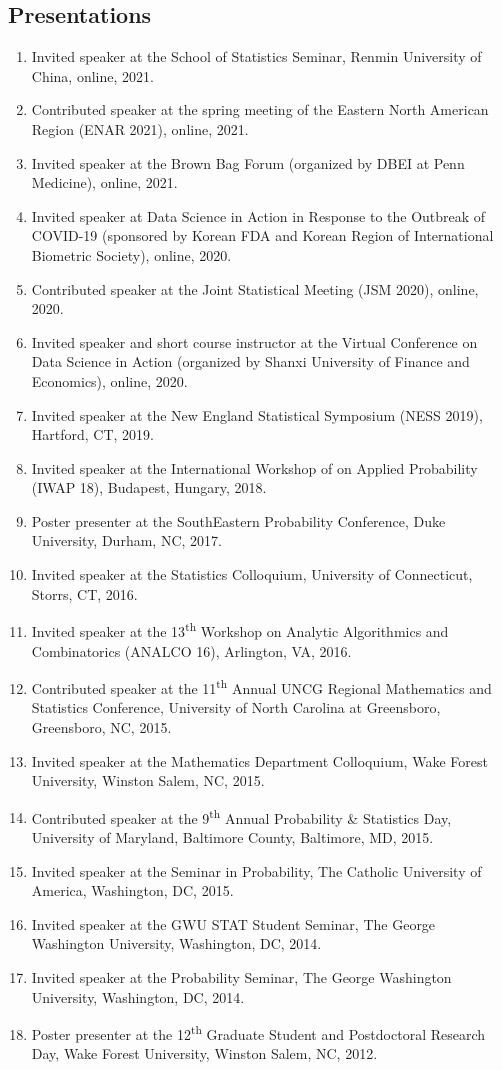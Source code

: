 \documentclass[margin]{res}
\begin{document}
\begin{resume}
\section{Presentations}
\begin{enumerate}
	\item Invited speaker at the School of Statistics Seminar, 
	Renmin University of China, online, 2021.
	\item Contributed speaker at the spring meeting of the Eastern 
	North American Region (ENAR 2021), online, 2021.
	\item Invited speaker at the Brown Bag Forum (organized by DBEI 
	at Penn Medicine), online, 2021.
	\item Invited speaker at Data Science in Action in Response to 
	the Outbreak of COVID-19 (sponsored by Korean FDA and Korean 
	Region of International Biometric Society), online, 2020.
	\item Contributed speaker at the Joint Statistical Meeting (JSM 
	2020), 
	online, 2020.
	\item Invited speaker and short course instructor at the Virtual 
	Conference on Data Science in Action (organized by Shanxi 
	University of Finance and Economics), online, 2020.
	\item Invited speaker at the New England Statistical Symposium (NESS 2019), Hartford, CT, 2019.
	\item Invited speaker at the International Workshop of on Applied Probability (IWAP 18), Budapest, Hungary, 2018.
	\item Poster presenter at the SouthEastern Probability Conference, Duke University, Durham, NC, 2017.
	\item Invited speaker at the Statistics Colloquium, University of Connecticut, Storrs, CT, 2016.
	\item Invited speaker at the 13\textsuperscript{th} Workshop on Analytic Algorithmics and Combinatorics (ANALCO 16), Arlington, VA, 2016.
	\item Contributed speaker at the 11\textsuperscript{th} Annual UNCG Regional Mathematics and Statistics Conference, University of North Carolina at Greensboro, Greensboro, NC, 2015.
	\item Invited speaker at the Mathematics Department Colloquium, Wake Forest University, Winston Salem, NC, 2015. 
	\item Contributed speaker at the 9\textsuperscript{th} Annual Probability \& Statistics Day, University of Maryland, Baltimore County, Baltimore, MD, 2015.
	\item Invited speaker at the Seminar in Probability, The Catholic University of America, Washington, DC, 2015.
	\item Invited speaker at the GWU STAT Student Seminar, The George Washington University, Washington, DC, 2014.
	\item Invited speaker at the Probability Seminar, The George Washington University, Washington, DC, 2014.
	\item Poster presenter at the 12\textsuperscript{th} Graduate Student and Postdoctoral Research Day, Wake Forest University, Winston Salem, NC, 2012.
\end{enumerate}


\end{resume}
\end{document}
